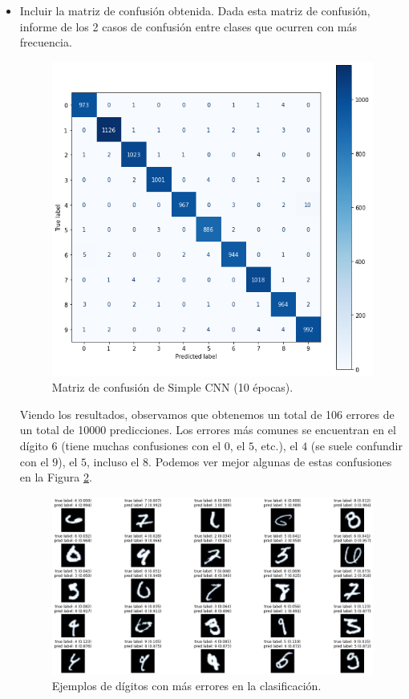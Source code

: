 \documentclass[12pt]{scrartcl}
\begin{document}
\begin{itemize}
    \item Incluir la matriz de confusión obtenida. Dada esta matriz de confusión, informe de los 2 casos de confusión entre clases que ocurren con más frecuencia.
    \begin{figure}[H]
        \centering
        \includegraphics[scale=0.58]{confmatrx1.png}
        \caption{Matriz de confusión de Simple CNN (10 épocas).}
        \label{fig:confmatrx1}
    \end{figure}
    Viendo los resultados, observamos que obtenemos un total de 106 errores de un total de 10000 predicciones. Los errores más comunes se encuentran en el dígito $6$ (tiene muchas confusiones con el $0$, el $5$, etc.), el $4$ (se suele confundir con el $9$), el $5$, incluso el $8$. Podemos ver mejor algunas de estas confusiones en la Figura \ref{fig:errores1}.
    \begin{figure}[H]
        \centering
        \includegraphics[scale=0.38]{mosterror1.png}
        \caption{Ejemplos de dígitos con más errores en la clasificación.}
        \label{fig:errores1}
    \end{figure}
    

\end{itemize}
\end{document}
